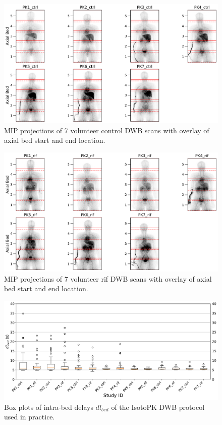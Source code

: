 %
\begin{figure} [ht!]
\centering
\includegraphics[scale=0.5,angle=0]{3_Results/3_1_DWB_Optimization/figures/3_1_MIPS_ctrl.pdf}
\caption{MIP projections of 7 volunteer control DWB scans with overlay of axial bed start and end location.} 
\label{fig3_1:ctrl_mips}
\end{figure}
%
\begin{figure} [ht!]
\centering
\includegraphics[scale=0.5,angle=0]{3_Results/3_1_DWB_Optimization/figures/3_1_MIPS_rif.pdf}
\caption{MIP projections of 7 volunteer rif DWB scans with overlay of axial bed start and end location.} 
\label{fig3_1:rif_mips}
\end{figure}
%
%
%
\begin{figure} [ht!]
\centering
\includegraphics[scale=0.5,angle=0]{3_Results/3_1_DWB_Optimization/figures/3_1_BoxPlots_DTBeds.pdf}
\caption{Box plots of intra-bed delays $dl_{bed}$ of the IsotoPK DWB protocol used in practice.} 
\label{fig3_1:BoxPlots_beds}
\end{figure}
